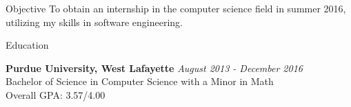 \documentclass{resume} %
\begin{document}
\center

\begin{rSection}{Objective}
To obtain an internship in the computer science field in summer 2016, utilizing my skills in software engineering.
\end{rSection}
\begin{rSection}{Education}

{\bf Purdue University, West Lafayette} \hfill {\em August 2013 - December 2016} \\ 
Bachelor of Science in Computer Science with a Minor in Math\\
Overall GPA: 3.57/4.00

\end{rSection}

\end{document}
